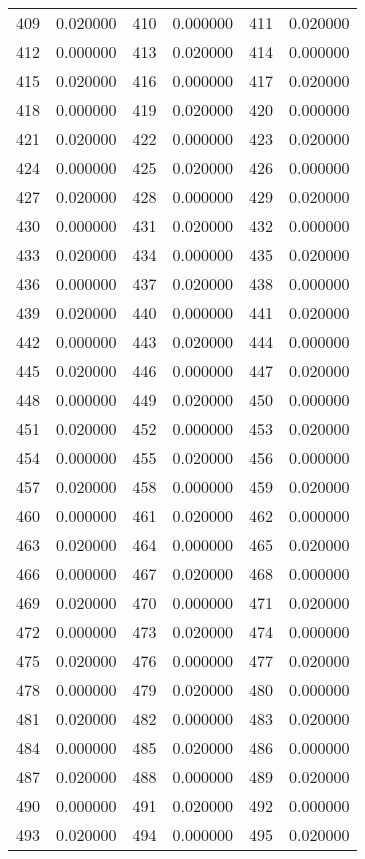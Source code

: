 \documentclass[12pt]{article}
\begin{document}
\begin{longtable}{@{}cc|cc|cc@{}}
409 & 0.020000 & 410 & 0.000000 & 411 & 0.020000 \\
412 & 0.000000 & 413 & 0.020000 & 414 & 0.000000 \\
415 & 0.020000 & 416 & 0.000000 & 417 & 0.020000 \\
418 & 0.000000 & 419 & 0.020000 & 420 & 0.000000 \\
421 & 0.020000 & 422 & 0.000000 & 423 & 0.020000 \\
424 & 0.000000 & 425 & 0.020000 & 426 & 0.000000 \\
427 & 0.020000 & 428 & 0.000000 & 429 & 0.020000 \\
430 & 0.000000 & 431 & 0.020000 & 432 & 0.000000 \\
433 & 0.020000 & 434 & 0.000000 & 435 & 0.020000 \\
436 & 0.000000 & 437 & 0.020000 & 438 & 0.000000 \\
439 & 0.020000 & 440 & 0.000000 & 441 & 0.020000 \\
442 & 0.000000 & 443 & 0.020000 & 444 & 0.000000 \\
445 & 0.020000 & 446 & 0.000000 & 447 & 0.020000 \\
448 & 0.000000 & 449 & 0.020000 & 450 & 0.000000 \\
451 & 0.020000 & 452 & 0.000000 & 453 & 0.020000 \\
454 & 0.000000 & 455 & 0.020000 & 456 & 0.000000 \\
457 & 0.020000 & 458 & 0.000000 & 459 & 0.020000 \\
460 & 0.000000 & 461 & 0.020000 & 462 & 0.000000 \\
463 & 0.020000 & 464 & 0.000000 & 465 & 0.020000 \\
466 & 0.000000 & 467 & 0.020000 & 468 & 0.000000 \\
469 & 0.020000 & 470 & 0.000000 & 471 & 0.020000 \\
472 & 0.000000 & 473 & 0.020000 & 474 & 0.000000 \\
475 & 0.020000 & 476 & 0.000000 & 477 & 0.020000 \\
478 & 0.000000 & 479 & 0.020000 & 480 & 0.000000 \\
481 & 0.020000 & 482 & 0.000000 & 483 & 0.020000 \\
484 & 0.000000 & 485 & 0.020000 & 486 & 0.000000 \\
487 & 0.020000 & 488 & 0.000000 & 489 & 0.020000 \\
490 & 0.000000 & 491 & 0.020000 & 492 & 0.000000 \\
493 & 0.020000 & 494 & 0.000000 & 495 & 0.020000 \\

\end{longtable}
\end{document}
